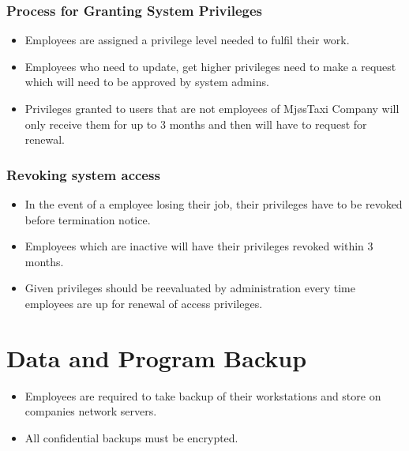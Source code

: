 \subsubsection*{Process for Granting System Privileges} 
\vspace{-0.6em}
    \begin{itemize}[noitemsep]
        \item Employees are assigned a privilege level needed to fulfil their work.
        \item Employees who need to update, get higher privileges need to make a request which will need to be approved by system admins.
        \item Privileges granted to users that are not employees of MjøsTaxi Company will only receive them for up to 3 months and then will have to request for renewal.
    \end{itemize}

\subsubsection*{Revoking system access}
\vspace{-0.6em}
    \begin{itemize}[noitemsep]
        \item In the event of a employee losing their job, their privileges have to be revoked before termination notice.
        \item Employees which are inactive will have their privileges revoked within 3 months.
        \item Given privileges should be reevaluated by administration every time employees are up for renewal of access privileges.
    \end{itemize}

\section{Data and Program Backup}
\vspace{-0.4em}
    \begin{itemize}[noitemsep]
        \item Employees are required to take backup of their workstations and store on companies network servers.
        \item All confidential backups must be encrypted.
    \end{itemize}
    

